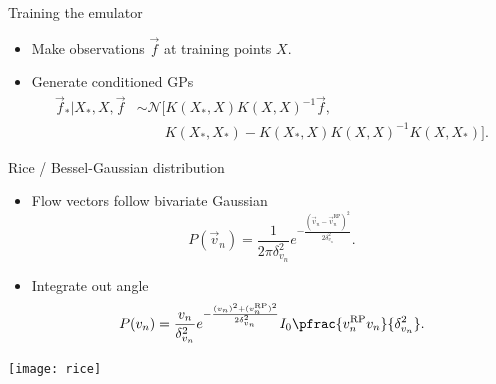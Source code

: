 \documentclass{beamer}
\begin{document}
\begin{frame}[label=training]{Training the emulator}
  \begin{itemize}
    \item Make observations $\vec f$ at training points $X$.
    \item Generate conditioned GPs
        \begin{align*}
          \vec f_* | X_*,X,\vec f &\sim \mathcal N[K(X_*,X)K(X,X)^{-1}\vec f, \\
          &\qquad {} K(X_*,X_*) - K(X_*,X)K(X,X)^{-1}K(X,X_*)].
        \end{align*}
  \end{itemize}

  \centering


\end{frame}


\begin{frame}[label=rice]{Rice / Bessel-Gaussian distribution}
  \vspace{1em}

  \begin{itemize}
    \item Flow vectors follow bivariate Gaussian
      \begin{equation*}
        P(\vec v_n) = \frac{1}{2\pi\delta_{v_n}^2} e^{ -\frac{(\vec v_n - \vec v_n^\text{RP})^2}{2\delta_{v_n}^2} }.
      \end{equation*}
    \item Integrate out angle
      \begin{equation*}
        P(v_n) = \frac{v_n}{\delta_{v_n}^2} e^{ -\frac{(v_n)^2 + (v_n^\text{RP})^2}{2\delta_{v_n}^2} }
          I_0 \pfrac{v_n^\text{RP}v_n}{\delta_{v_n}^2}.
      \end{equation*}
  \end{itemize}

  \vspace{1em}

  \centering
  \texttt{[image: rice]}
  
\end{frame}
\end{document}
